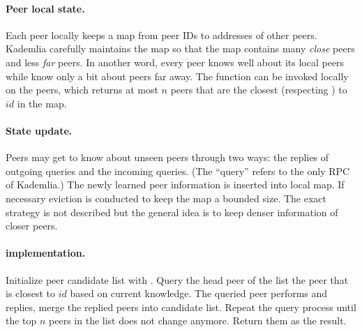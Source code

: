 \paragraph{Peer local state.}
Each peer locally keeps a map from peer IDs to addresses of other peers.
Kademlia carefully maintains the map so that the map contains many \emph{close} peers and less \emph{far} peers.
In another word, every peer knows well about its local peers while know only a bit about peers far away.
The function \lfind[$id$, $n$] can be invoked locally on the peers, which returns at most $n$ peers that are the closest (respecting \dist) to $id$ in the map.

\paragraph{State update.}
Peers may get to know about unseen peers through two ways: the replies of outgoing queries and the incoming queries.
(The ``query'' refers to the only RPC of Kademlia.)
The newly learned peer information is inserted into local map.
If necessary eviction is conducted to keep the map a bounded size.
The exact strategy is not described but the general idea is to keep denser information of closer peers.

\paragraph{\find[$id$, $n$] implementation.}
Initialize peer candidate list with \lfind[$id$, $n$].
Query the head peer of the list \ie the peer that is closest to $id$ based on current knowledge.
The queried peer performs \lfind[$id$, $n$] and replies, merge the replied peers into candidate list.
Repeat the query process until the top $n$ peers in the list does not change anymore.
Return them as the \find result.
